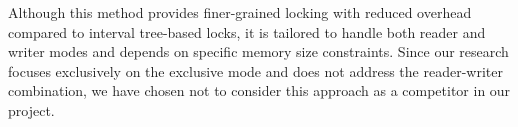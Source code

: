 Although this method provides finer-grained locking with reduced overhead compared to interval tree-based locks, it is tailored to handle both reader and writer modes and depends on specific memory size constraints. 
Since our research focuses exclusively on the exclusive mode and does not address the reader-writer combination, we have chosen not to consider this approach as a competitor in our project.

